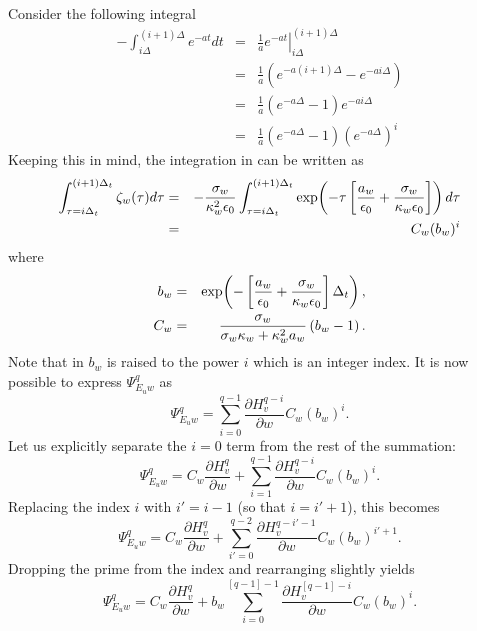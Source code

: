Consider the following integral
\begin{eqnarray}
  -\int_{i\Delta}^{(i+1)\Delta} e^{-a t}dt &=&
     \left. \frac{1}{a} e^{-at} \right|_{i\Delta}^{(i+1)\Delta}\\
   &=& \frac{1}{a} \left(e^{-a(i+1)\Delta} - e^{-ai\Delta}\right) \\
   &=& \frac{1}{a} \left(e^{-a\Delta}-1\right)e^{-ai\Delta} \\
   &=& \frac{1}{a} \left(e^{-a\Delta}-1\right)
                   \left(e^{-a\Delta}\right)^i
\end{eqnarray}
Keeping this in mind, the integration in  can be
written as
\begin{eqnarray}
  \int_{\tau=i\Delta_t}^{(i+1)\Delta_t} \zeta_w(\tau) d\tau &=&
  -\frac{\sigma_w}{\kappa_w^2\epsilon_0}
  \int_{\tau=i\Delta_t}^{(i+1)\Delta_t}
   \exp\!\left(-\tau\left[\frac{a_w}{\epsilon_0}+
                       \frac{\sigma_w}{\kappa_w\epsilon_0}\right]\right)
    d\tau \\
  &=& C_w (b_w)^i
  \label{eq:cbTerm}
\end{eqnarray}
where
\begin{eqnarray}
  b_w &=& \exp\!\left(-\left[
    \frac{a_w}{\epsilon_0} +
    \frac{\sigma_w}{\kappa_w\epsilon_0}\right]\Delta_t\right), \\
  C_w &=& \frac{\sigma_w}{\sigma_w\kappa_w + \kappa_w^2 a_w}
          \left(b_w - 1\right).
\end{eqnarray}
Note that in  $b_w$ is raised to the power $i$ which
is an integer index.  It is now possible to express $\Psi_{E_uw}^q$ as
\begin{equation}
  \Psi_{E_uw}^q =
  \sum_{i=0}^{q-1} \frac{\partial H_v^{q-i}}{\partial w} C_w (b_w)^i.
  \label{eq:psiSum}
\end{equation}
Let us explicitly separate the $i=0$ term from the rest of the
summation: 
\begin{equation}
  \Psi_{E_uw}^q =
   C_w \frac{\partial H_v^q}{\partial w}+ 
  \sum_{i=1}^{q-1} \frac{\partial H_v^{q-i}}{\partial w} C_w (b_w)^i.
\end{equation}
Replacing the index $i$ with $i'=i-1$ (so that $i=i'+1$), this becomes
\begin{equation}
  \Psi_{E_uw}^q =
   C_w \frac{\partial H_v^q}{\partial w}+ 
  \sum_{i'=0}^{q-2} 
    \frac{\partial H_v^{q-i'-1}}{\partial w} C_w (b_w)^{i'+1}.
\end{equation}
Dropping the prime from the index and rearranging slightly yields
\begin{equation}
  \Psi_{E_uw}^q =
  C_w \frac{\partial H_v^q}{\partial w}+ 
  b_w \sum_{i=0}^{[q-1]-1} 
    \frac{\partial H_v^{[q-1]-i}}{\partial w} C_w (b_w)^i.
\end{equation}
